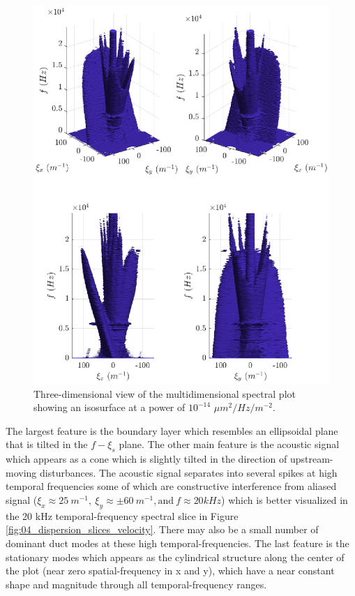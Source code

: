 \begin{figure}
  \centering
  \includegraphics{../matlab/04_dispersion_analysis/dispersion_3d.eps}
  \caption{Three-dimensional view of the multidimensional spectral plot showing an isosurface at a power of $10^{-14}$ $\mu m^2/Hz/m^{-2}$.}
  \label{fig:04_dispersion_3d}
\end{figure}
The largest feature is the boundary layer which resembles an ellipsoidal plane that is tilted in the $f-\xi_s$ plane.
The other main feature is the acoustic signal which appears as a cone which is slightly tilted in the direction of upstream-moving disturbances.
The acoustic signal separates into several spikes at high temporal frequencies some of which are constructive interference from aliased signal ($\xi_x\approx25\ m^{-1},\ \xi_y\approx\pm60\ m^{-1}, \textrm{and}\ f\approx20 kHz$) which is better visualized in the 20 kHz temporal-frequency spectral slice in Figure \ref{fig:04_dispersion_slices_velocity}.
There may also be a small number of dominant duct modes at these high temporal-frequencies.
The last feature is the stationary modes which appears as the cylindrical structure along the center of the plot (near zero spatial-frequency in x and y), which have a near constant shape and magnitude through all temporal-frequency ranges.

